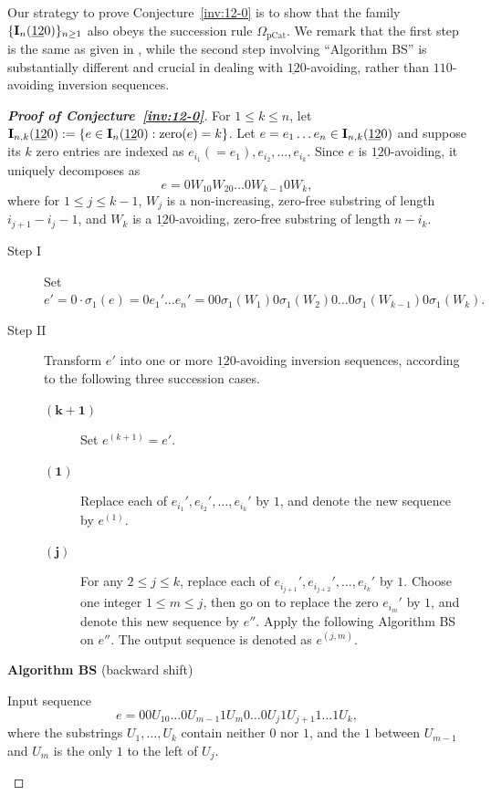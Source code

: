 \documentclass[12pt,A4]{amsart}
\numberwithin{equation}{section}
\theoremstyle{plain}
\theoremstyle{definition}
\def\zero{\mathrm{zero}}
\def\I{\operatorname{{\bf I}}}
\begin{document}
Our strategy to prove Conjecture~\ref{inv:12-0} is to show that the family $\{\I_n(\underline{12}0)\}_{n\ge 1}$ also obeys the succession rule $\Omega_{\mathrm{pCat}}$. We remark that the first step is the same as given in \cite{bbgr}, while the second step involving ``Algorithm BS'' is substantially different and crucial in dealing with $\underline{12}0$-avoiding, rather than $110$-avoiding inversion sequences.

\begin{proof}[{\bf Proof of Conjecture~\ref{inv:12-0}}]
For $1\leq k\leq n$, let $\I_{n,k}(\underline{12}0):=\{e\in\I_n(\underline{12}0):\zero(e)=k\}$.
Let $e=e_1\ldots e_n\in\I_{n,k}(\underline{12}0)$ and suppose its $k$ zero entries are indexed as $e_{i_1}(=e_1),e_{i_2},\ldots,e_{i_k}$. Since $e$ is $\underline{12}0$-avoiding, it uniquely decomposes as $$e=0W_10W_20\ldots0W_{k-1}0W_k,$$ where for $1\le j\le k-1$, $W_j$ is a non-increasing, zero-free substring of length $i_{j+1}-i_j-1$, and $W_k$ is a $\underline{12}0$-avoiding, zero-free substring of length $n-i_k$.
\begin{description}
	\item[Step I] Set $e'=0\cdot\sigma_1(e)=0e_1'\ldots e_n'=00\sigma_1(W_1)0\sigma_1(W_2)0\ldots 0\sigma_1(W_{k-1})0\sigma_1(W_k).$
	\item[Step II] Transform $e'$ into one or more $\underline{12}0$-avoiding inversion sequences, according to the following three succession cases.
	\begin{description}
		\item[$\mathbf{(k+1)}$] Set $e^{(k+1)}=e'$.
		\item[$\mathbf{(1)}$] Replace each of $e_{i_1}',e_{i_2}',\ldots,e_{i_k}'$ by $1$, and denote the new sequence by $e^{(1)}$.
		\item[$\mathbf{(j)}$] For any $2\le j\le k$, replace each of $e_{i_{j+1}}',e_{i_{j+2}}',\ldots,e_{i_k}'$ by $1$. Choose one integer $1\le m\le j$, then go on to replace the zero $e_{i_m}'$ by $1$, and denote this new sequence by $e''$. Apply the following Algorithm BS on $e''$. The output sequence is denoted as $e^{(j,m)}$.
	\end{description}
\end{description}
\begin{framed}
\begin{center}
 {\bf Algorithm BS} (backward shift)
\end{center}
\noindent Input sequence $$e=00U_10\ldots 0U_{m-1}1U_{m}0\ldots0U_j1U_{j+1}1\ldots1U_k,$$ where the substrings $U_1,\ldots,U_k$ contain neither $0$ nor $1$, and the $1$ between $U_{m-1}$ and $U_m$ is the only $1$ to the left of $U_j$.


\end{framed}
\end{proof}
\end{document}
